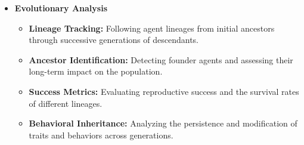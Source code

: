 \begin{itemize}
    \item \textbf{Evolutionary Analysis}
    \begin{itemize}
        \item \textbf{Lineage Tracking:} Following agent lineages from initial ancestors through successive generations of descendants.
        \item \textbf{Ancestor Identification:} Detecting founder agents and assessing their long-term impact on the population.
        \item \textbf{Success Metrics:} Evaluating reproductive success and the survival rates of different lineages.
        \item \textbf{Behavioral Inheritance:} Analyzing the persistence and modification of traits and behaviors across generations.
    \end{itemize}
\end{itemize}





